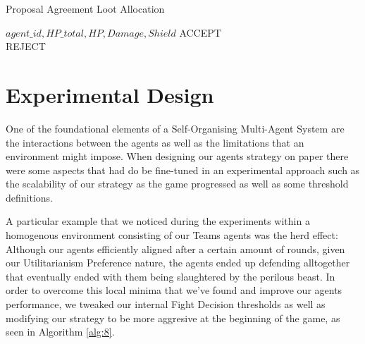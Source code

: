 \begin{algorithm}[htb]
\caption{Proposal Agreement Loot Allocation}\label{alg:proplootallocation}
\begin{algorithmic}
\scriptsize
\Require $agent\_id, HP\_total, HP, Damage, Shield$
\Return ACCEPT
\Else\\
\Return REJECT
\EndIf
\EndIf
\EndIf
\EndIf
\EndIf
\end{algorithmic}
\end{algorithm}




\section{Experimental Design}

One of the foundational elements of a Self-Organising Multi-Agent System are the interactions between the agents as well as the limitations that an environment might impose. When designing our agents strategy on paper there were some aspects that had do be fine-tuned in an experimental approach such as the scalability of our strategy as the game progressed as well as some threshold definitions.

A particular example that we noticed during the experiments within a homogenous environment consisting of our Teams agents was the herd effect: Although our agents efficiently aligned after a certain amount of rounds, given our Utilitarianism Preference nature, the agents ended up defending alltogether that eventually ended with them being slaughtered by the perilous beast. In order to overcome this local minima that we've found and improve our agents performance, we tweaked our internal Fight Decision thresholds as well as modifying our strategy to be more aggresive at the beginning of the game, as seen in Algorithm \ref{alg:8}.


